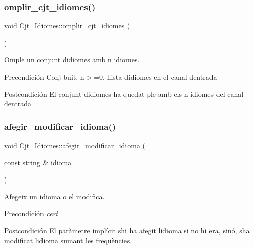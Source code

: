 \subsubsection{\texorpdfstring{omplir\+\_\+cjt\+\_\+idiomes()}{omplir\_cjt\_idiomes()}}
{\footnotesize\ttfamily void Cjt\+\_\+\+Idiomes\+::omplir\+\_\+cjt\+\_\+idiomes (\begin{DoxyParamCaption}{ }\end{DoxyParamCaption})}



Omple un conjunt d\textquotesingle{}idiomes amb n idiomes. 

\begin{DoxyPrecond}{Precondición}
Conj buit, n$>$=0, llista d\textquotesingle{}idiomes en el canal d\textquotesingle{}entrada 
\end{DoxyPrecond}
\begin{DoxyPostcond}{Postcondición}
El conjunt d\textquotesingle{}idiomes ha quedat ple amb els n idiomes del canal d\textquotesingle{}entrada 
\end{DoxyPostcond}
\mbox{\label{class_cjt___idiomes_a9e75f643c62886df635403bd3108c1df}} 
\subsubsection{\texorpdfstring{afegir\+\_\+modificar\+\_\+idioma()}{afegir\_modificar\_idioma()}}
{\footnotesize\ttfamily void Cjt\+\_\+\+Idiomes\+::afegir\+\_\+modificar\+\_\+idioma (\begin{DoxyParamCaption}\item[{const string \&}]{idioma }\end{DoxyParamCaption})}



Afegeix un idioma o el modifica. 

\begin{DoxyPrecond}{Precondición}
{\itshape cert} 
\end{DoxyPrecond}
\begin{DoxyPostcond}{Postcondición}
El paràmetre implícit s\textquotesingle{}hi ha afegit l\textquotesingle{}idioma si no hi era, sinó, s\textquotesingle{}ha modificat l\textquotesingle{}idioma sumant les freqüències. 
\end{DoxyPostcond}
\mbox{\label{class_cjt___idiomes_a745de8e5d29e235cb1e2142d8acaaad9}} 
